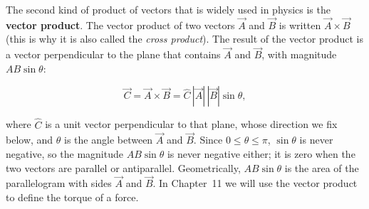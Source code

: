 \documentclass[11pt,a4paper]{article}
\begin{document}
The second kind of product of vectors that is widely used in physics is the \textbf{vector
product}. The vector product of two vectors $\vec{A}$ and $\vec{B}$ is written
$\vec{A}\times\vec{B}$ (this is why it is also called the \emph{cross product}). The result of the
vector product is a vector perpendicular to the plane that contains $\vec{A}$ and $\vec{B}$, with
magnitude $AB\sin\theta$:
\begin{keyresult}
\begin{equation}\label{eq:cross}
  \vec{C} = \vec{A}\times\vec{B} = \hat{C}\,|\vec{A}|\,|\vec{B}|\sin\theta ,
\end{equation}
\end{keyresult}
where $\hat{C}$ is a unit vector perpendicular to that plane, whose direction we fix below, and
$\theta$ is the angle between $\vec{A}$ and $\vec{B}$. Since $0 \le \theta \le \pi$, $\sin\theta$ is
never negative, so the magnitude $AB\sin\theta$ is never negative either; it is zero when the two
vectors are parallel or antiparallel. Geometrically, $AB\sin\theta$ is the area of the
parallelogram with sides $\vec{A}$ and $\vec{B}$. In Chapter~11 we will use the vector product to
define the torque of a force.
\end{document}
